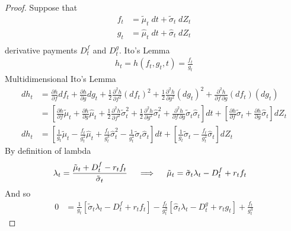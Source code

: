 \documentclass[12pt]{article}
\theoremstyle{plain}
\theoremstyle{definition}
\theoremstyle{remark}
\begin{document}
\begin{proof}

\clearpage
Suppose that
\begin{align*}
  f_t &= \tilde{\mu}_t\;dt + \tilde{\sigma}_t\;dZ_t \\
  g_t &= \hat{\mu}_t\;dt + \hat{\sigma}_t\;dZ_t \\
\end{align*}
derivative payments $D_t^f$ and $D_t^g$. Ito's Lemma
\begin{align*}
  h_t
  = h(f_t,g_t,t)
  = \frac{f_t}{g_t}
\end{align*}
Multidimensional Ito's Lemma
\begin{align*}
  dh_t
  &=
  \frac{\partial h}{\partial f}
  df_{t}
  +
  \frac{\partial h}{\partial g}
  dg_{t}
  +
  \frac{1}{2}
  \frac{\partial^2 h}{\partial f^2}
  (df_t)^2
  +
  \frac{1}{2}
  \frac{\partial^2 h}{\partial g^2}
  (dg_{t})^2
  +
  \frac{\partial^2 h}{\partial f\,\partial g}
  (df_{t})
  (dg_{t})
  \\
  &=
  \left[
  \frac{\partial h}{\partial f}
  \tilde{\mu}_t
  +
  \frac{\partial h}{\partial g}
  \hat{\mu}_t
  +
  \frac{1}{2}
  \frac{\partial^2 h}{\partial f^2}
  \tilde{\sigma}^2_t
  +
  \frac{1}{2}
  \frac{\partial^2 h}{\partial g^2}
  \hat{\sigma}^2_t
  +
  \frac{\partial^2 h}{\partial f\,\partial g}
  \tilde{\sigma}_t
  \hat{\sigma}_t
  \right]
  dt
  +
  \left[
  \frac{\partial h}{\partial f}
  \tilde{\sigma}_t
  +
  \frac{\partial h}{\partial g}
  \hat{\sigma}_t
  \right]
  dZ_t
  \\
  dh_t
  &=
  \left[
  \frac{1}{g_t}
  \tilde{\mu}_t
  -
  \frac{f_t}{g_t^2}
  \hat{\mu}_t
  +
  \frac{f_t}{g_t^3}
  \hat{\sigma}^2_t
  -
  \frac{1}{g_t^2}
  \tilde{\sigma}_t \hat{\sigma}_t
  \right]
  dt
  +
  \left[
  \frac{1}{g_t}
  \tilde{\sigma}_t
  -
  \frac{f_t}{g_t^2}
  \hat{\sigma}_t
  \right]
  dZ_t
\end{align*}
By definition of lambda
\begin{align*}
  \lambda_t
  &=
  \frac{%
    \tilde{\mu}_{t}+D_{t}^f
    -
    r_tf_{t}
  }{\tilde{\sigma}_{t}}
  \quad\implies\quad
  \tilde{\mu}_{t}
  =
  \tilde{\sigma}_{t}\lambda_t
  -D_{t}^f
  + r_tf_{t}
\end{align*}
And so
\begin{align*}
  0
  &=
  \frac{1}{g_t}
  \left[
  \tilde{\sigma}_{t}\lambda_t
  -D_{t}^f
  + r_tf_{t}
  \right]
  -
  \frac{f_t}{g_t^2}
  \left[
  \hat{\sigma}_{t}\lambda_t
  -D_{t}^g
  + r_tg_{t}
  \right]
  +
  \frac{f_t}{g_t^3}

\end{align*}
\end{proof}
\end{document}
